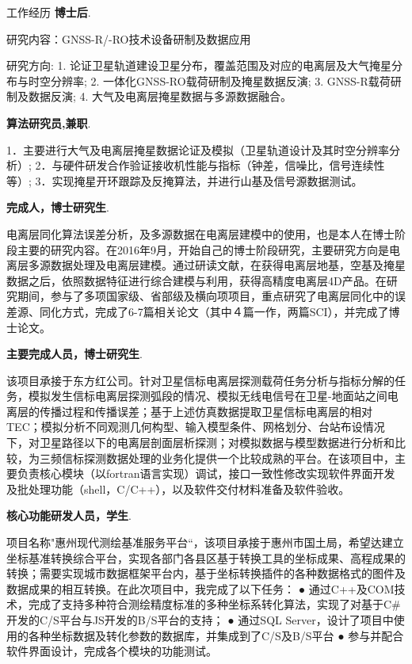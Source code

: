 \begin{rubric}{工作经历}
\entry*[2021-2 至今]\textbf{博士后}.

研究内容：GNSS-R/-RO技术设备研制及数据应用

研究方向: 1. 论证卫星轨道建设卫星分布，覆盖范围及对应的电离层及大气掩星分布与时空分辨率; 2. 一体化GNSS-RO载荷研制及掩星数据反演; 3. GNSS-R载荷研制及数据反演; 4. 大气及电离层掩星数据与多源数据融合。

\entry*[2020 至今]\textbf{算法研究员,兼职}.

1．主要进行大气及电离层掩星数据论证及模拟（卫星轨道设计及其时空分辨率分析）; 2．与硬件研发合作验证接收机性能与指标（钟差，信噪比，信号连续性等）; 3．实现掩星开环跟踪及反掩算法，并进行山基及信号源数据测试。

\entry*[2016-09 至 2020年7月]\space\textbf{完成人，博士研究生}.

电离层同化算法误差分析，及多源数据在电离层建模中的使用，也是本人在博士阶段主要的研究内容。在2016年9月，开始自己的博士阶段研究，主要研究方向是电离层多源数据处理及电离层建模。通过研读文献，在获得电离层地基，空基及掩星数据之后，依照数据特征进行综合建模与利用，获得高精度电离层4D产品。在研究期间，参与了多项国家级、省部级及横向项项目，重点研究了电离层同化中的误差源、同化方式，完成了6-7篇相关论文（其中４篇一作，两篇SCI），并完成了博士论文。

\entry*[2015-06 至 2016-09]\space\textbf{主要完成人员，博士研究生}.

该项目承接于东方红公司。针对卫星信标电离层探测载荷任务分析与指标分解的任务，模拟发生信标电离层探测弧段的情况、模拟无线电信号在卫星-地面站之间电离层的传播过程和传播误差；基于上述仿真数据提取卫星信标电离层的相对TEC；模拟分析不同观测几何构型、输入模型条件、网格划分、台站布设情况下，对卫星路径以下的电离层剖面层析探测；对模拟数据与模型数据进行分析和比较，为三频信标探测数据处理的业务化提供一个比较成熟的平台。在该项目中，主要负责核心模块（以fortran语言实现）调试，接口一致性修改实现软件界面开发及批处理功能（shell，C/C++），以及软件交付材料准备及软件验收。

\entry*[2013-06 至 2014-08]\space\textbf{核心功能研发人员，学生}.

项目名称"惠州现代测绘基准服务平台“，该项目承接于惠州市国土局，希望达建立坐标基准转换综合平台，实现各部门各县区基于转换工具的坐标成果、高程成果的转换；需要实现城市数据框架平台内，基于坐标转换插件的各种数据格式的图件及数据成果的相互转换。在此次项目中，我完成了以下任务： ● 通过C++及COM技术，完成了支持多种符合测绘精度标准的多种坐标系转化算法，实现了对基于C\#开发的C/S平台与JS开发的B/S平台的支持； ● 通过SQL Server，设计了项目中使用的各种坐标数据及转化参数的数据库，并集成到了C/S及B/S平台 ● 参与并配合软件界面设计，完成各个模块的功能测试。


\end{rubric}
